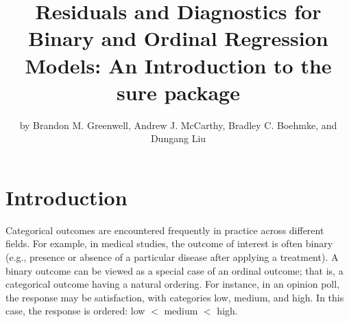 \title{Residuals and Diagnostics for Binary and Ordinal Regression Models: An Introduction to the sure package}
\author{by Brandon M. Greenwell, Andrew J. McCarthy, Bradley C. Boehmke, and Dungang Liu}

\maketitle



\section{Introduction}

Categorical outcomes are encountered frequently in practice across different fields. For example, in medical studies, the outcome of interest is often binary (e.g., presence or absence of a particular disease after applying a treatment). A binary outcome can be viewed as a special case of an ordinal outcome; that is, a categorical outcome having a natural ordering. For instance, in an opinion poll, the response may be satisfaction, with categories low, medium, and high. In this case, the response is ordered: low $<$ medium $<$ high.


